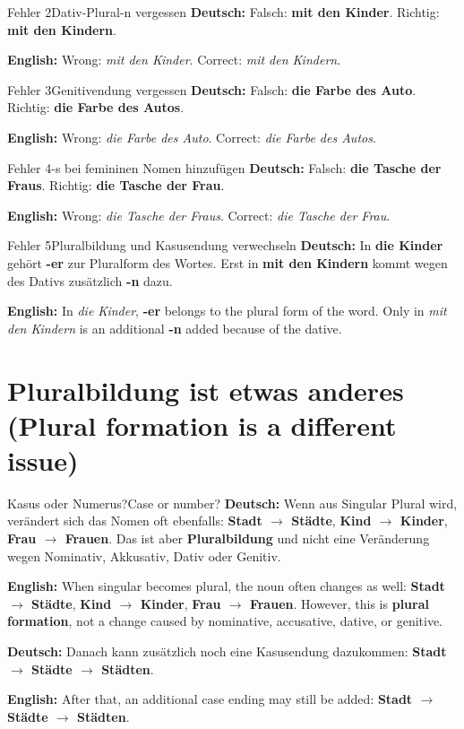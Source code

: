 \documentclass[a4paper,11pt]{article}
\newcommand{\GermanText}[1]{\textbf{Deutsch: }#1\par}
\newcommand{\EnglishText}[1]{{\small\color{SoftGray}\textbf{English: }#1\par}}
\begin{document}
\begin{grammarentry}{Fehler 2}{Dativ-Plural-n vergessen}
\GermanText{Falsch: \textbf{mit den Kinder}. Richtig: \textbf{mit den Kindern}.}
\EnglishText{Wrong: \emph{mit den Kinder}. Correct: \emph{mit den Kindern}.}
\end{grammarentry}

\begin{grammarentry}{Fehler 3}{Genitivendung vergessen}
\GermanText{Falsch: \textbf{die Farbe des Auto}. Richtig: \textbf{die Farbe des Autos}.}
\EnglishText{Wrong: \emph{die Farbe des Auto}. Correct: \emph{die Farbe des Autos}.}
\end{grammarentry}

\begin{grammarentry}{Fehler 4}{-s bei femininen Nomen hinzufügen}
\GermanText{Falsch: \textbf{die Tasche der Fraus}. Richtig: \textbf{die Tasche der Frau}.}
\EnglishText{Wrong: \emph{die Tasche der Fraus}. Correct: \emph{die Tasche der Frau}.}
\end{grammarentry}

\begin{grammarentry}{Fehler 5}{Pluralbildung und Kasusendung verwechseln}
\GermanText{In \textbf{die Kinder} gehört \textbf{-er} zur Pluralform des Wortes. Erst in \textbf{mit den Kindern} kommt wegen des Dativs zusätzlich \textbf{-n} dazu.}
\EnglishText{In \emph{die Kinder}, \textbf{-er} belongs to the plural form of the word. Only in \emph{mit den Kindern} is an additional \textbf{-n} added because of the dative.}
\end{grammarentry}

\section{Pluralbildung ist etwas anderes \textnormal{(Plural formation is a different issue)}}

\begin{grammarentry}{Kasus oder Numerus?}{Case or number?}
\GermanText{Wenn aus Singular Plural wird, verändert sich das Nomen oft ebenfalls: \textbf{Stadt $\rightarrow$ Städte}, \textbf{Kind $\rightarrow$ Kinder}, \textbf{Frau $\rightarrow$ Frauen}. Das ist aber \textbf{Pluralbildung} und nicht eine Veränderung wegen Nominativ, Akkusativ, Dativ oder Genitiv.}
\EnglishText{When singular becomes plural, the noun often changes as well: \textbf{Stadt $\rightarrow$ Städte}, \textbf{Kind $\rightarrow$ Kinder}, \textbf{Frau $\rightarrow$ Frauen}. However, this is \textbf{plural formation}, not a change caused by nominative, accusative, dative, or genitive.}

\GermanText{Danach kann zusätzlich noch eine Kasusendung dazukommen: \textbf{Stadt $\rightarrow$ Städte $\rightarrow$ Städten}.}
\EnglishText{After that, an additional case ending may still be added: \textbf{Stadt $\rightarrow$ Städte $\rightarrow$ Städten}.}
\end{grammarentry}
\end{document}
